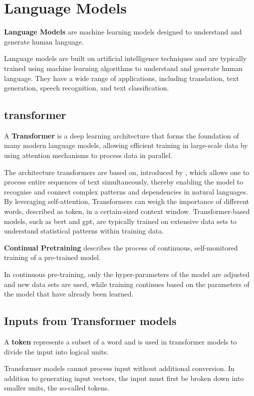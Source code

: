 \section{Language Models}\label{sec:language-models}
\begin{definition}\label{def:language-models}
    \textbf{Language Models} are machine learning models designed to understand and generate human language.
\end{definition}
Language models are built on artificial intelligence techniques and are typically trained using machine learning algorithms to understand and generate human language. 
They have a wide range of applications, including translation, text generation, speech recognition, and text classification.
\subsection{transformer}\label{transformer}
\begin{definition}\label{def:transformer}
    A \textbf{Transformer} is a deep learning architecture that forms the foundation of many modern language models, allowing efficient training in large-scale data by using attention mechanisms to process data in parallel.
\end{definition}
The architecture transformers are based on, introduced by \citet{vaswani2017attention}, which allows one to process entire sequences of text simultaneously, thereby enabling the model to recognise and connect complex patterns and dependencies in natural languages. 
By leveraging self-attention, Transformers can weigh the importance of different words, described as token, in a certain-sized context window. 
Transformer-based models, such as \ac{bert} and \ac{gpt}, are typically trained on extensive data sets to understand statistical patterns within training data.\citep{atallah2023impact}
\begin{definition}\label{def:continuous-pretraining}
    \textbf{Continual Pretraining} describes the process of continuous, self-monitored training of a pre-trained model.
\end{definition}
In continuous pre-training, only the hyper-parameters of the model are adjusted and new data sets are used, while training continues based on the parameters of the model that have already been learned.
\subsection{Inputs from Transformer models}
\begin{definition}\label{def:token}
    A \textbf{token} represents a subset of a word and is used in transformer models to divide the input into logical units.
\end{definition}
Transformer models cannot process input without additional conversion.
In addition to generating input vectors, the input must first be broken down into smaller units, the so-called tokens.
%
